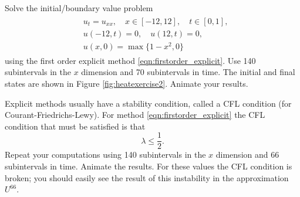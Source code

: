 \begin{comment}
For the next problem, we need to show how Matplotlib can be used to create a 2D animation.
The following is a simple working example that animates a sine wave.

\begin{lstlisting}
import numpy as np
from matplotlib import animation, pyplot as plt

def sine_animation(res=100):
    # Make the x and y data.
    x = np.linspace(-1, 1, res+1)[:-1]
    y = np.sin(np.pi * x)
    # Initialize a matplotlib figure.
    f = plt.figure()
    # Set the x and y axes by constructing an axes object.
    plt.axes(xlim=(-1,1), ylim=(-1,1))
    # Plot an empty line to use in the animation.
    # Notice that we are unpacking a tuple of length 1.
    line, = plt.plot([], [])
    # Define an animation function that will update the line to
    # reflect the desired data for the i'th frame.
    def animate(i):
        # Set the data for updated version of the line.
        line.set_data(x, np.roll(y, i))
        # Notice that this returns a tuple of length 1.
        return line,
    # Create the animation object.
    # 'frames' is the number of frames before the animation should repeat.
    # 'interval' is the amount of time to wait before updating the plot.
    # Be sure to assign the animation a name so that Python does not
    # immediately garbage collect (delete) the object.
    a = animation.FuncAnimation(f, animate, frames=y.size, interval=20)
    # Show the animation.
    plt.show()

# Run the animation function we just defined.
sine_animation()
\end{lstlisting}
\end{comment}

\begin{problem}
\label{prob:heat_exercise2}
Solve the initial/boundary value problem
\begin{align}
	\begin{split}
	&{ } u_t = u_{xx}, \quad x \in [-12,12],\quad t \in [0,1], \\
	&{ } u(-12,t) = 0,\quad u(12,t) = 0,\\
	&{ } u(x,0) = \max\{1 - x^2,0\}
	\end{split}
\end{align}
using the first order explicit method \ref{eqn:firstorder_explicit}.
Use 140 subintervals in the $x$ dimension and 70 subintervals in time.
The initial and final states are shown in Figure \ref{fig:heatexercise2}.
Animate your results.

Explicit methods usually have a stability condition, called a CFL condition (for Courant-Friedrichs-Lewy).
For method \ref{eqn:firstorder_explicit} the CFL condition that must be satisfied is that
\[\lambda \leq \frac{1}{2}.\]
Repeat your computations using 140 subintervals in the $x$ dimension and 66 subintervals in time. Animate the results.
For these values the CFL condition is broken; you should easily see the result of this instability in the approximation $U^{66}$.
\end{problem}

